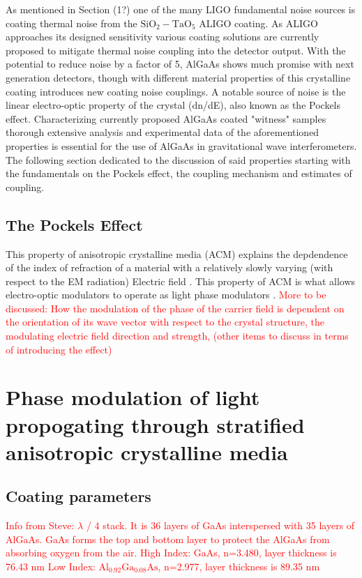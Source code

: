 
As mentioned in Section (1?) one of the many LIGO fundamental noise sources is coating thermal noise from the $\mathrm{SiO}_2-\mathrm{TaO}_5$ ALIGO coating. As ALIGO approaches its designed sensitivity various coating solutions are currently proposed to mitigate thermal noise coupling into the detector output.
With the potential to reduce noise by a factor of 5, AlGaAs shows much promise with next generation detectors, though with different material properties of this crystalline coating introduces new coating noise couplings. A notable source of noise is the linear electro-optic property of the crystal (dn/dE), also known as the Pockels effect.  Characterizing currently proposed AlGaAs coated "witness" samples thorough extensive analysis and experimental data of the aforementioned properties is essential for the use of AlGaAs in gravitational wave interferometers. The following section dedicated to the discussion of said properties starting with the fundamentals on the Pockels effect, the coupling mechanism and estimates of coupling.


\subsection{The Pockels Effect}
This property of anisotropic crystalline media (ACM) explains the depdendence of the index of refraction of a material with a relatively slowly varying (with respect to the EM radiation) Electric field . This property of ACM is what allows electro-optic modulators to operate as light phase modulators\cite{yariv} \cite{nye}. \textcolor{red}{More to be discussed: How the modulation of the phase of the carrier field is dependent on the orientation of its wave vector with respect to the crystal structure, the modulating electric field direction and strength, (other items to discuss in terms of introducing the effect)  }


\section{Phase modulation of light propogating through stratified anisotropic crystalline media}

\subsection{Coating parameters}
\textcolor{red}{Info from Steve:
$\lambda$ / 4 stack.  It is 36 layers of GaAs interspersed with 35 layers of AlGaAs.   GaAs forms the top and bottom layer to protect the AlGaAs from absorbing oxygen from the air.
High Index:  GaAs, n=3.480, layer thickness is 76.43 nm
Low Index:  $ \mathrm{Al}_{0.92} \mathrm{Ga}_{0.08} \mathrm{As} $, n=2.977, layer thickness is 89.35 nm}

